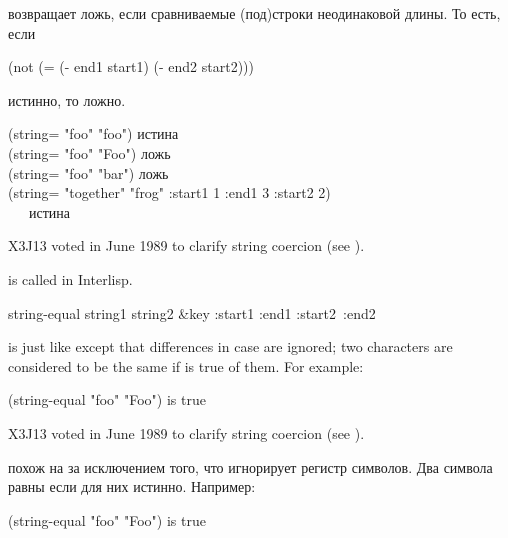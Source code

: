 \begin{defun}[Function]
 возвращает ложь, если сравниваемые (под)строки неодинаковой
длины. То есть, если 
\begin{lisp}
(not (= (- end1 start1) (- end2 start2)))
\end{lisp}
истинно, то  ложно.

\begin{lisp}
(string= "foo" "foo") \textrm{истина} \\
(string= "foo" "Foo") \textrm{ложь} \\
(string= "foo" "bar") \textrm{ложь} \\
(string= "together" "frog" :start1 1 :end1 3 :start2 2) \\
~~~\textrm{истина}
\end{lisp}

\begin{newer}
X3J13 voted in June 1989 
to clarify string coercion (see ).
\end{newer}

\beforenoterule
\begin{incompatibility}
 is called  in Interlisp.
\end{incompatibility}
\afternoterule
\end{defun}

\begin{defun}[Function]
string-equal string1 string2 &key :start1 :end1 :start2~:end2

 is just like  except that differences
in case are ignored; two characters are considered to be the same
if  is true of them.
For example:
\begin{lisp}
(string-equal "foo" "Foo") \textrm{is true}
\end{lisp}
\begin{newer}
X3J13 voted in June 1989 
to clarify string coercion (see ).
\end{newer}

 похож на  за исключением того, что игнорирует
регистр символов. Два символа равны если  для них истинно.
Например:
\begin{lisp}
(string-equal "foo" "Foo") \textrm{is true}
\end{lisp}
\end{defun}

